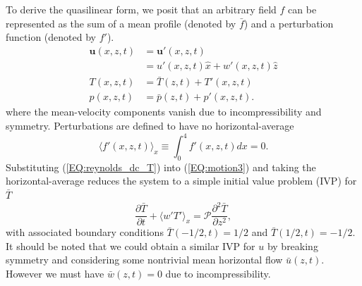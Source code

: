 \documentclass[reprint,amsmath,amssymb,aps]{revtex4-1}
\renewcommand{\vec}[1]{\boldsymbol{#1}}
\newcommand{\eq}[1]{(\ref{#1})}
\begin{document}
To derive the quasilinear form, we posit that an arbitrary field $f$ can be represented as the sum of a mean profile (denoted by $\bar{f}$) and a perturbation function (denoted by $f'$).
\begin{align}
    \vec{u}(x, z, t) &= \vec{u'}(x, z, t) \label{EQ:reynolds_dc_u}\\
    &= u'(x, z, t)\hat{x} + w'(x, z, t)\hat{z} \\
    T(x, z, t) &= \bar{T}(z, t) + T'(x, z, t) \label{EQ:reynolds_dc_T}\\
    p(x, z, t) &= \bar{p}(z, t) +  p'(x, z, t) \label{EQ:reynolds_dc_p}.
\end{align}
where the mean-velocity components vanish due to incompressibility and symmetry. Perturbations are defined to have no horizontal-average
\begin{equation}
    \langle f'(x, z, t) \rangle_x \equiv \int_{0}^4 f'(x, z, t) dx = 0.
\end{equation}
Substituting \eq{EQ:reynolds_dc_T} into \eq{EQ:motion3} and taking the horizontal-average reduces the system to a simple initial value problem (IVP) for $\bar{T}$
\begin{equation}
  \frac{\partial \bar{T}}{\partial t} + \langle w'T' \rangle_x = \mathcal{P}  \frac{\partial^2 \bar{T}}{\partial z^2}, \label{EQ:T0_IVP}
\end{equation}
with associated boundary conditions $\bar{T}(-1/2, t) = 1/2$ and $\bar{T}(1/2, t) = -1/2$. It should be noted that we could obtain a similar IVP for $u$ by breaking symmetry and considering some nontrivial mean horizontal flow $\bar{u}(z, t)$. However we must have $\bar{w}(z, t) = 0$ due to incompressibility.
\end{document}
